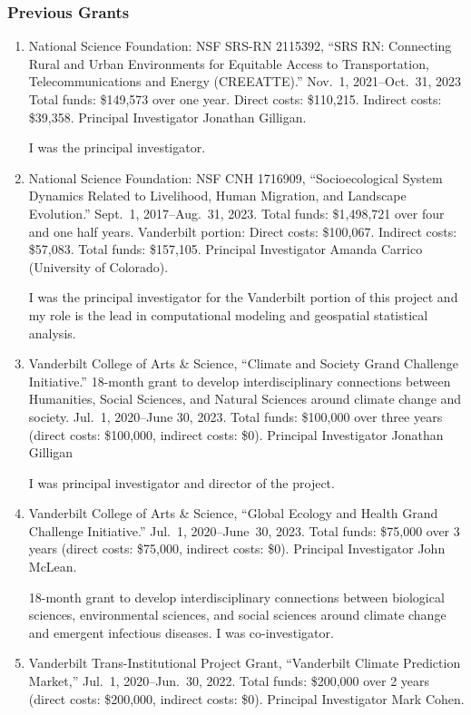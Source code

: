 \subsubsection{Previous Grants}
\begin{enumerate}
%
%
%
\item National Science Foundation: NSF SRS-RN 2115392,
``SRS RN: Connecting Rural and Urban Environments for Equitable Access to
Transportation, Telecommunications and Energy (CREEATTE).''
Nov.~1, 2021--Oct.~31, 2023
Total funds: \$149,573 over one year. Direct costs: \$110,215. Indirect costs: \$39,358.
Principal Investigator Jonathan Gilligan.
\begin{credit}
	I was the principal investigator.
\end{credit}
%
%
\item National Science Foundation: NSF CNH 1716909,
``Socioecological System Dynamics Related to Livelihood, Human Migration, and Landscape Evolution.''
Sept.~1, 2017--Aug.~31, 2023.
Total funds: \$1,498,721 over four and one half years. Vanderbilt portion: Direct costs: \$100,067. Indirect costs: \$57,083. Total funds: \$157,105.
Principal Investigator Amanda Carrico (University of Colorado).
\begin{credit}
	I was the principal investigator for the Vanderbilt portion of this project and my role is the lead in computational modeling and geospatial statistical analysis.
\end{credit}
%
\item Vanderbilt College of Arts \& Science,
``Climate and Society Grand Challenge Initiative.''
18-month grant to develop interdisciplinary connections between Humanities, Social Sciences, and Natural Sciences around climate change and society.
Jul.~1, 2020--June 30, 2023.
Total funds: \$100,000 over three years (direct costs: \$100,000,
indirect costs: \$0).
Principal Investigator Jonathan Gilligan
\begin{credit}
	I was principal investigator and director of the project.
\end{credit}
%
%
\item Vanderbilt College of Arts \& Science,
``Global Ecology and Health Grand Challenge Initiative.''
Jul.~1, 2020--June~30, 2023.
Total funds: \$75,000 over 3 years (direct costs: \$75,000, indirect costs: \$0).
Principal Investigator John McLean.
\begin{credit}
	18-month grant to develop interdisciplinary connections between biological sciences, environmental sciences, and social sciences around climate change and emergent infectious diseases.
	I was co-investigator.
\end{credit}
%
\item Vanderbilt Trans-Institutional Project Grant,
``Vanderbilt Climate Prediction Market,''
Jul.~1, 2020--Jun.~30, 2022.
Total funds: \$200,000 over 2 years (direct costs: \$200,000, indirect costs: \$0).
Principal Investigator Mark Cohen.


\end{enumerate}
